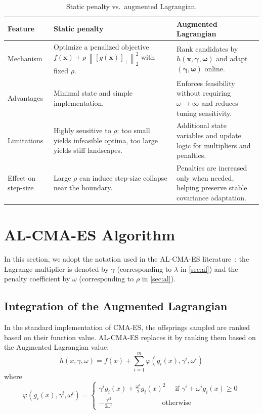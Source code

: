 \documentclass[11pt,a4paper]{article}
\numberwithin{equation}{section}
\numberwithin{figure}{section}
\numberwithin{table}{section}
\theoremstyle{definition}
\newcommand{\norm}[1]{\left\lVert #1 \right\rVert}
\newcommand{\pos}[1]{\left[#1\right]_+}
\begin{document}
\begin{table}[H]
  \centering
  \caption{Static penalty vs.\ augmented Lagrangian.}
  \label{tab:comparison}
  \begin{tabularx}{\linewidth}{@{} l X X @{}}
    \toprule
    {Feature} & {Static penalty} & {Augmented Lagrangian} \\
    \midrule
    Mechanism &
    Optimize a penalized objective \(f(\bm{x})+\rho\,\norm{\pos{g(\bm{x})}}_2^2\) with fixed \(\rho\). &
    Rank candidates by \(h(\bm{x},\bm{\gamma},\bm{\omega})\) and adapt \((\bm{\gamma},\bm{\omega})\) online. \\
    \addlinespace
    Advantages &
    Minimal state and simple implementation. &
    Enforces feasibility without requiring \(\omega\to\infty\) and reduces tuning sensitivity. \\
    \addlinespace
    Limitations &
    Highly sensitive to \(\rho\): too small yields infeasible optima, too large yields stiff landscapes. &
    Additional state variables and update logic for multipliers and penalties. \\
    \addlinespace
    Effect on step-size &
    Large \(\rho\) can induce step-size collapse near the boundary. &
    Penalties are increased only when needed, helping preserve stable covariance adaptation. \\
    \bottomrule
  \end{tabularx}
\end{table}

\section{AL-CMA-ES Algorithm}\label{sec:al-cma-es}

In this section, we adopt the notation used in the AL-CMA-ES literature~\cite{ArnoldPorter2015,Atamna2016}: the Lagrange multiplier is denoted by $\gamma$ (corresponding to $\lambda$ in \cref{sec:al}) and the penalty coefficient by $\omega$ (corresponding to $\rho$ in \cref{sec:al}). 

\subsection{Integration of the Augmented Lagrangian}

In the standard implementation of CMA-ES, the offsprings sampled are ranked based on their function value. AL-CMA-ES replaces it by ranking them based on the Augmented Lagrangian value:
\begin{equation}
\label{eq:al-cmaes-merit}
h(x, \gamma, \omega) = f(x) + \sum^m_{i=1} \varphi(g_i(x), \gamma^i, \omega^i)
\end{equation}
where 
$$
\varphi(g_i(x), \gamma^i, \omega^i) =
\begin{cases}
    \gamma^i g_i(x) + \frac{\omega^i}{2}g_i(x) ^2 \quad \text{ if } \gamma^i + \omega^i g_i(x) \ge 0 \\
    -\frac{\gamma^{i2}}{2 \omega^i} \qquad \qquad \quad \qquad\text{otherwise}
\end{cases}
$$
\end{document}
